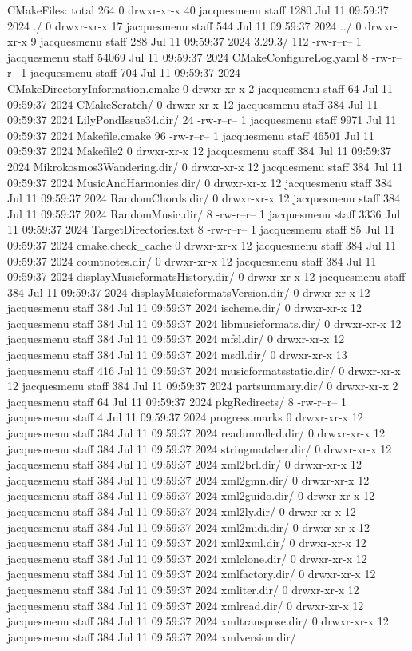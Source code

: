 CMakeFiles:
total 264
  0 drwxr-xr-x  40 jacquesmenu  staff   1280 Jul 11 09:59:37 2024 ./
  0 drwxr-xr-x  17 jacquesmenu  staff    544 Jul 11 09:59:37 2024 ../
  0 drwxr-xr-x   9 jacquesmenu  staff    288 Jul 11 09:59:37 2024 3.29.3/
112 -rw-r--r--   1 jacquesmenu  staff  54069 Jul 11 09:59:37 2024 CMakeConfigureLog.yaml
  8 -rw-r--r--   1 jacquesmenu  staff    704 Jul 11 09:59:37 2024 CMakeDirectoryInformation.cmake
  0 drwxr-xr-x   2 jacquesmenu  staff     64 Jul 11 09:59:37 2024 CMakeScratch/
  0 drwxr-xr-x  12 jacquesmenu  staff    384 Jul 11 09:59:37 2024 LilyPondIssue34.dir/
 24 -rw-r--r--   1 jacquesmenu  staff   9971 Jul 11 09:59:37 2024 Makefile.cmake
 96 -rw-r--r--   1 jacquesmenu  staff  46501 Jul 11 09:59:37 2024 Makefile2
  0 drwxr-xr-x  12 jacquesmenu  staff    384 Jul 11 09:59:37 2024 Mikrokosmos3Wandering.dir/
  0 drwxr-xr-x  12 jacquesmenu  staff    384 Jul 11 09:59:37 2024 MusicAndHarmonies.dir/
  0 drwxr-xr-x  12 jacquesmenu  staff    384 Jul 11 09:59:37 2024 RandomChords.dir/
  0 drwxr-xr-x  12 jacquesmenu  staff    384 Jul 11 09:59:37 2024 RandomMusic.dir/
  8 -rw-r--r--   1 jacquesmenu  staff   3336 Jul 11 09:59:37 2024 TargetDirectories.txt
  8 -rw-r--r--   1 jacquesmenu  staff     85 Jul 11 09:59:37 2024 cmake.check_cache
  0 drwxr-xr-x  12 jacquesmenu  staff    384 Jul 11 09:59:37 2024 countnotes.dir/
  0 drwxr-xr-x  12 jacquesmenu  staff    384 Jul 11 09:59:37 2024 displayMusicformatsHistory.dir/
  0 drwxr-xr-x  12 jacquesmenu  staff    384 Jul 11 09:59:37 2024 displayMusicformatsVersion.dir/
  0 drwxr-xr-x  12 jacquesmenu  staff    384 Jul 11 09:59:37 2024 ischeme.dir/
  0 drwxr-xr-x  12 jacquesmenu  staff    384 Jul 11 09:59:37 2024 libmusicformats.dir/
  0 drwxr-xr-x  12 jacquesmenu  staff    384 Jul 11 09:59:37 2024 mfsl.dir/
  0 drwxr-xr-x  12 jacquesmenu  staff    384 Jul 11 09:59:37 2024 msdl.dir/
  0 drwxr-xr-x  13 jacquesmenu  staff    416 Jul 11 09:59:37 2024 musicformatsstatic.dir/
  0 drwxr-xr-x  12 jacquesmenu  staff    384 Jul 11 09:59:37 2024 partsummary.dir/
  0 drwxr-xr-x   2 jacquesmenu  staff     64 Jul 11 09:59:37 2024 pkgRedirects/
  8 -rw-r--r--   1 jacquesmenu  staff      4 Jul 11 09:59:37 2024 progress.marks
  0 drwxr-xr-x  12 jacquesmenu  staff    384 Jul 11 09:59:37 2024 readunrolled.dir/
  0 drwxr-xr-x  12 jacquesmenu  staff    384 Jul 11 09:59:37 2024 stringmatcher.dir/
  0 drwxr-xr-x  12 jacquesmenu  staff    384 Jul 11 09:59:37 2024 xml2brl.dir/
  0 drwxr-xr-x  12 jacquesmenu  staff    384 Jul 11 09:59:37 2024 xml2gmn.dir/
  0 drwxr-xr-x  12 jacquesmenu  staff    384 Jul 11 09:59:37 2024 xml2guido.dir/
  0 drwxr-xr-x  12 jacquesmenu  staff    384 Jul 11 09:59:37 2024 xml2ly.dir/
  0 drwxr-xr-x  12 jacquesmenu  staff    384 Jul 11 09:59:37 2024 xml2midi.dir/
  0 drwxr-xr-x  12 jacquesmenu  staff    384 Jul 11 09:59:37 2024 xml2xml.dir/
  0 drwxr-xr-x  12 jacquesmenu  staff    384 Jul 11 09:59:37 2024 xmlclone.dir/
  0 drwxr-xr-x  12 jacquesmenu  staff    384 Jul 11 09:59:37 2024 xmlfactory.dir/
  0 drwxr-xr-x  12 jacquesmenu  staff    384 Jul 11 09:59:37 2024 xmliter.dir/
  0 drwxr-xr-x  12 jacquesmenu  staff    384 Jul 11 09:59:37 2024 xmlread.dir/
  0 drwxr-xr-x  12 jacquesmenu  staff    384 Jul 11 09:59:37 2024 xmltranspose.dir/
  0 drwxr-xr-x  12 jacquesmenu  staff    384 Jul 11 09:59:37 2024 xmlversion.dir/

